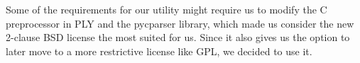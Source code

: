 \noindent Some of the requirements for our utility might require us to modify
the C preprocessor in PLY and the pycparser library, which made us consider
the new 2-clause BSD license the most suited for us. Since it also gives us the
option to later move to a more restrictive license like GPL, we decided to use
it.
